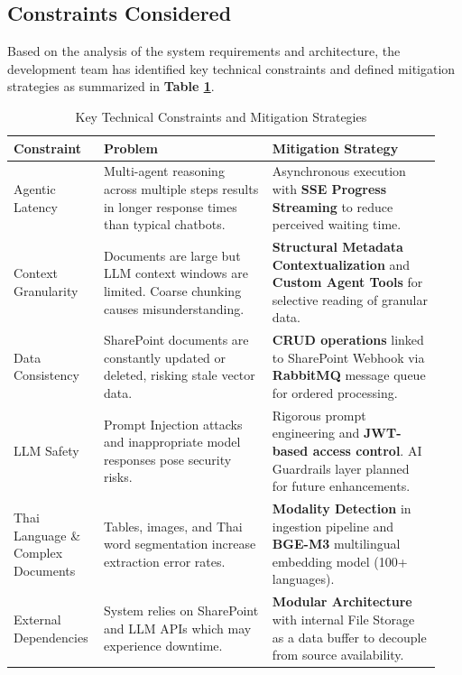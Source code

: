 \documentclass[12pt]{article}
\begin{document}
\subsection{Constraints Considered}
Based on the analysis of the system requirements and architecture, the development team has identified key technical constraints and defined mitigation strategies as summarized in \textbf{Table \ref{tab:constraints}}.

\begin{longtable}{|p{0.18\linewidth}|p{0.38\linewidth}|p{0.38\linewidth}|}
\caption{Key Technical Constraints and Mitigation Strategies}
\label{tab:constraints} \\
\hline
\textbf{Constraint} & \textbf{Problem} & \textbf{Mitigation Strategy} \\ \hline
\endhead
Agentic Latency & Multi-agent reasoning across multiple steps results in longer response times than typical chatbots. & Asynchronous execution with \textbf{SSE Progress Streaming} to reduce perceived waiting time. \\ \hline
Context Granularity & Documents are large but LLM context windows are limited. Coarse chunking causes misunderstanding. & \textbf{Structural Metadata Contextualization} and \textbf{Custom Agent Tools} for selective reading of granular data. \\ \hline
Data Consistency & SharePoint documents are constantly updated or deleted, risking stale vector data. & \textbf{CRUD operations} linked to SharePoint Webhook via \textbf{RabbitMQ} message queue for ordered processing. \\ \hline
LLM Safety & Prompt Injection attacks and inappropriate model responses pose security risks. & Rigorous prompt engineering and \textbf{JWT-based access control}. AI Guardrails layer planned for future enhancements. \\ \hline
Thai Language \& Complex Documents & Tables, images, and Thai word segmentation increase extraction error rates. & \textbf{Modality Detection} in ingestion pipeline and \textbf{BGE-M3} multilingual embedding model (100+ languages). \\ \hline
External Dependencies & System relies on SharePoint and LLM APIs which may experience downtime. & \textbf{Modular Architecture} with internal File Storage as a data buffer to decouple from source availability. \\ \hline
\end{longtable}

\newpage
\end{document}
